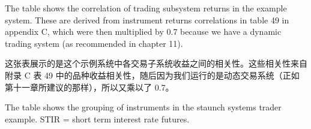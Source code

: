\begin{englishblock} The table shows the correlation of trading subsystem returns in the example system. These are derived from instrument returns correlations in table 49 in appendix C, which were then multiplied by 0.7 because we have a dynamic trading system (as recommended in chapter 11). \end{englishblock}

\begin{chineseblock}这张表展示的是这个示例系统中各交易子系统收益之间的相关性。这些相关性来自附录 C 表 49 中的品种收益相关性，随后因为我们运行的是动态交易系统（正如第十一章所建议的那样），所以又乘以了 0.7。 \end{chineseblock}

\begin{bilingualtableblock} 
\end{bilingualtableblock}

\begin{englishblock} The table shows the grouping of instruments in the staunch systems trader example. STIR = short term interest rate futures. \end{englishblock}

